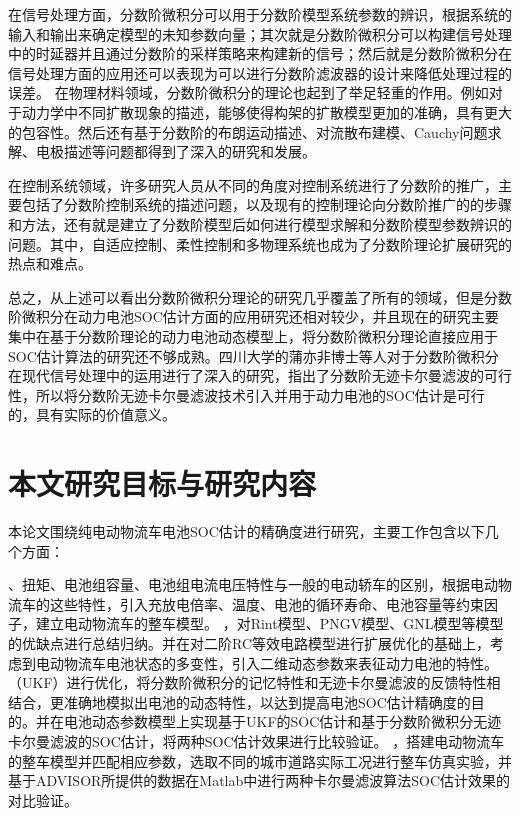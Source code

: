 在信号处理方面，分数阶微积分可以用于分数阶模型系统参数的辨识，根据系统的输入和输出来确定模型的未知参数向量；其次就是分数阶微积分可以构建信号处理中的时延器并且通过分数阶的采样策略来构建新的信号；然后就是分数阶微积分在信号处理方面的应用还可以表现为可以进行分数阶滤波器的设计来降低处理过程的误差。
在物理材料领域，分数阶微积分的理论也起到了举足轻重的作用。例如对于动力学中不同扩散现象的描述，能够使得构架的扩散模型更加的准确，具有更大的包容性。然后还有基于分数阶的布朗运动描述、对流散布建模、Cauchy问题求解、电极描述等问题都得到了深入的研究和发展。

在控制系统领域，许多研究人员从不同的角度对控制系统进行了分数阶的推广，主要包括了分数阶控制系统的描述问题，以及现有的控制理论向分数阶推广的的步骤和方法，还有就是建立了分数阶模型后如何进行模型求解和分数阶模型参数辨识的问题。其中，自适应控制、柔性控制和多物理系统也成为了分数阶理论扩展研究的热点和难点。

总之，从上述可以看出分数阶微积分理论的研究几乎覆盖了所有的领域，但是分数阶微积分在动力电池SOC估计方面的应用研究还相对较少，并且现在的研究主要集中在基于分数阶理论的动力电池动态模型上，将分数阶微积分理论直接应用于SOC估计算法的研究还不够成熟。四川大学的蒲亦非博士等人对于分数阶微积分在现代信号处理中的运用进行了深入的研究，指出了分数阶无迹卡尔曼滤波的可行性，所以将分数阶无迹卡尔曼滤波技术引入并用于动力电池的SOC估计是可行的，具有实际的价值意义。
\section{本文研究目标与研究内容}
本论文围绕纯电动物流车电池SOC估计的精确度进行研究，主要工作包含以下几个方面：
\begin{enumerate}
、扭矩、电池组容量、电池组电流电压特性与一般的电动轿车的区别，根据电动物流车的这些特性，引入充放电倍率、温度、电池的循环寿命、电池容量等约束因子，建立电动物流车的整车模型。
，对Rint模型、PNGV模型、GNL模型等模型的优缺点进行总结归纳。并在对二阶RC等效电路模型进行扩展优化的基础上，考虑到电动物流车电池状态的多变性，引入二维动态参数来表征动力电池的特性。
（UKF）进行优化，将分数阶微积分的记忆特性和无迹卡尔曼滤波的反馈特性相结合，更准确地模拟出电池的动态特性，以达到提高电池SOC估计精确度的目的。并在电池动态参数模型上实现基于UKF的SOC估计和基于分数阶微积分无迹卡尔曼滤波的SOC估计，将两种SOC估计效果进行比较验证。
，搭建电动物流车的整车模型并匹配相应参数，选取不同的城市道路实际工况进行整车仿真实验，并基于ADVISOR所提供的数据在Matlab中进行两种卡尔曼滤波算法SOC估计效果的对比验证。
\end{enumerate}

